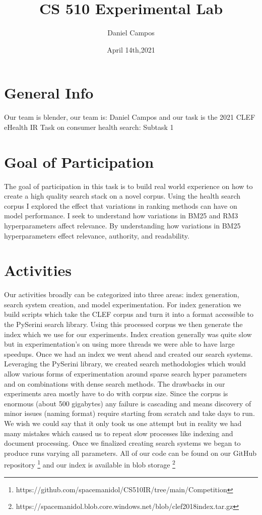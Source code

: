 \documentclass[11pt]{article}
\title{CS 510 Experimental Lab}
\author{Daniel Campos}
\date{April 14th,2021}
\begin{document}
\maketitle
\section{General Info}
Our team is blender, our team is: Daniel Campos and our task is the 2021 CLEF eHealth IR Task on consumer health search: Subtask 1
\section{Goal of Participation}
The goal of participation in this task is to build real world experience on how to create a high quality search stack on a novel corpus. Using the health search corpus I explored the effect that variations in ranking methods can have on model performance. I seek to understand how variations in BM25 and RM3 hyperparameters affect relevance. By understanding how variations in BM25 hyperparameters effect relevance, authority, and readability.
\section{Activities}
Our activities broadly can be categorized into three areas: index generation, search system creation, and model experimentation. For index generation we build scripts which take the CLEF corpus and turn it into a format accessible to the PySerini search library. Using this processed corpus we then generate the index which we use for our experiments. Index creation generally was quite slow but in experimentation's on using more threads we were able to have large speedups. Once we had an index we went ahead and created our search systems. Leveraging the PySerini library, we created search methodologies which would allow various forms of experimentation around sparse search hyper parameters and on combinations with dense search methods. The drawbacks in our experiments area mostly have to do with corpus size. Since the corpus is enormous (about 500 gigabytes) any failure is cascading and means discovery of minor issues (naming format) require starting from scratch and take days to run. We wish we could say that it only took us one attempt but in reality we had many mistakes which caused us to repeat slow processes like indexing and document processing. Once we finalized creating search systems we began to produce runs varying all parameters. All of our code can be found on our GitHub repository \footnote{https://github.com/spacemanidol/CS510IR/tree/main/Competition} and our index is available in blob storage \footnote{https://spacemanidol.blob.core.windows.net/blob/clef2018index.tar.gz} 
\end{document}
